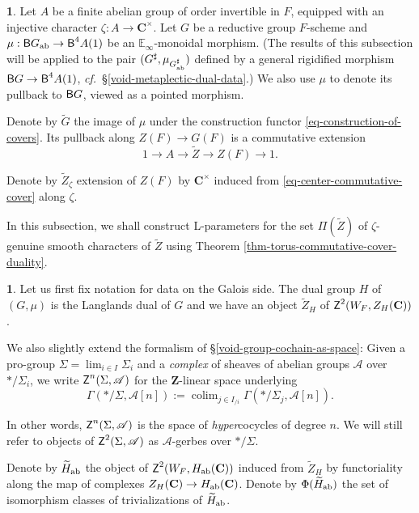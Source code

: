 \documentclass[10pt,english,reqno]{amsart}
\newcommand{\integers}{\mathbf Z}
\newcommand{\complexes}{\mathbf C}
\newcommand{\cycle}{\textnormal{\textsf{Z}}}
\newcommand{\deloop}{\textnormal{\textsf{B}}}
\DeclareMathOperator*\colim{colim}
\newcommand{\abelian}{\textnormal{ab}}
\theoremstyle{definition}
\numberwithin{equation}{section}
\newtheorem{untitledsubsubsection}[subsubsection]{}
\newenvironment{void}
{\begin{untitledsubsubsection}}
{\end{untitledsubsubsection}}
\begin{document}
\begin{void}
\label{void-duality-for-center-context}
Let $A$ be a finite abelian group of order invertible in $F$, equipped with an injective character $\zeta : A \rightarrow \complexes^{\times}$. Let $G$ be a reductive group $F$-scheme and $\mu : \deloop G_{\abelian} \rightarrow \deloop^4A(1)$ be an $\mathbb E_{\infty}$-monoidal morphism. (The results of this subsection will be applied to the pair $(G^{\sharp}, \mu_{G_{\abelian}^{\sharp}})$ defined by a general rigidified morphism $\deloop G \rightarrow \deloop^4A(1)$, \emph{cf.}~\S\ref{void-metaplectic-dual-data}.) We also use $\mu$ to denote its pullback to $\deloop G$, viewed as a pointed morphism.

Denote by $\widetilde G$ the image of $\mu$ under the construction functor \eqref{eq-construction-of-covers}. Its pullback along $Z(F) \rightarrow G(F)$ is a commutative extension
\begin{equation}
\label{eq-center-commutative-cover}
1 \rightarrow A \rightarrow \widetilde Z \rightarrow Z(F) \rightarrow 1.
\end{equation}

Denote by $\widetilde Z_{\zeta}$ extension of $Z(F)$ by $\complexes^{\times}$ induced from \eqref{eq-center-commutative-cover} along $\zeta$.

In this subsection, we shall construct L-parameters for the set $\Pi(\widetilde Z)$ of $\zeta$-genuine smooth characters of $\widetilde Z$ using Theorem \ref{thm-torus-commutative-cover-duality}.
\end{void}


\begin{void}
\label{void-duality-for-center-galois-data}
Let us first fix notation for data on the Galois side. The dual group $H$ of $(G, \mu)$ is the Langlands dual of $G$ and we have an object $\widetilde Z_H$ of $\cycle^2(W_F, Z_H(\complexes))$.

We also slightly extend the formalism of \S\ref{void-group-cochain-as-space}: Given a pro-group $\Sigma = \lim_{i\in I}\Sigma_i$ and a \emph{complex} of sheaves of abelian groups $\mathscr A$ over $*/\Sigma_i$, we write $\cycle^n(\Sigma, \mathscr A)$ for the $\integers$-linear space underlying
$$
\Gamma(*/\Sigma, \mathscr A[n]) := \colim_{j \in I_{/i}} \Gamma(*/\Sigma_j, \mathscr A[n]).
$$

In other words, $\cycle^n(\Sigma, \mathscr A)$ is the space of \emph{hyper}cocycles of degree $n$. We will still refer to objects of $\cycle^2(\Sigma, \mathscr A)$ as $\mathscr A$-gerbes over $*/\Sigma$.

Denote by $\widetilde H_{\abelian}$ the object of $\cycle^2(W_F, H_{\abelian}(\complexes))$ induced from $\widetilde Z_H$ by functoriality along the map of complexes $Z_H(\complexes) \rightarrow H_{\abelian}(\complexes)$. Denote by $\Phi(\widetilde H_{\abelian})$ the set of isomorphism classes of trivializations of $\widetilde H_{\abelian}$.
\end{void}
\end{document}
